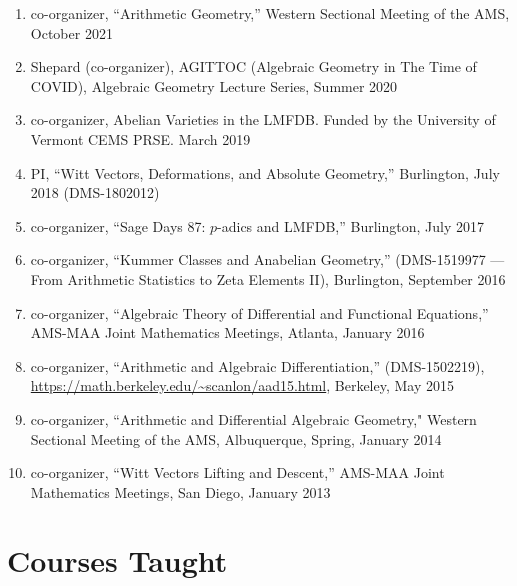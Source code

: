 \documentclass[a4paper,10pt]{article}
\begin{document}
\begin{enumerate} %
	\item co-organizer, ``Arithmetic Geometry,'' Western Sectional Meeting of the AMS, October 2021
	\item Shepard (co-organizer), AGITTOC (Algebraic Geometry in The Time of COVID), Algebraic Geometry Lecture Series, Summer 2020  
	\item co-organizer, Abelian Varieties in the LMFDB. Funded by the University of Vermont CEMS PRSE. March 2019
	\item PI, ``Witt Vectors, Deformations, and Absolute Geometry,'' Burlington, July 2018 (DMS-1802012)
	\item co-organizer, ``Sage Days 87: $p$-adics and LMFDB,'' Burlington, July 2017
	\item co-organizer, ``Kummer Classes and Anabelian Geometry,'' (DMS-1519977 --- From Arithmetic Statistics to Zeta Elements II), Burlington, September 2016
	\item co-organizer, ``Algebraic Theory of Differential and Functional Equations,''  AMS-MAA Joint Mathematics Meetings, Atlanta, January 2016
	\item co-organizer, ``Arithmetic and Algebraic Differentiation,'' (DMS-1502219), \url{https://math.berkeley.edu/~scanlon/aad15.html}, Berkeley, May 2015 
	\item co-organizer, ``Arithmetic and Differential Algebraic Geometry," Western Sectional Meeting of the AMS, Albuquerque, Spring, January 2014
	\item co-organizer, ``Witt Vectors Lifting and Descent,'' AMS-MAA Joint Mathematics Meetings, San Diego, January 2013
\end{enumerate}

\section*{Courses Taught}
\end{document}
